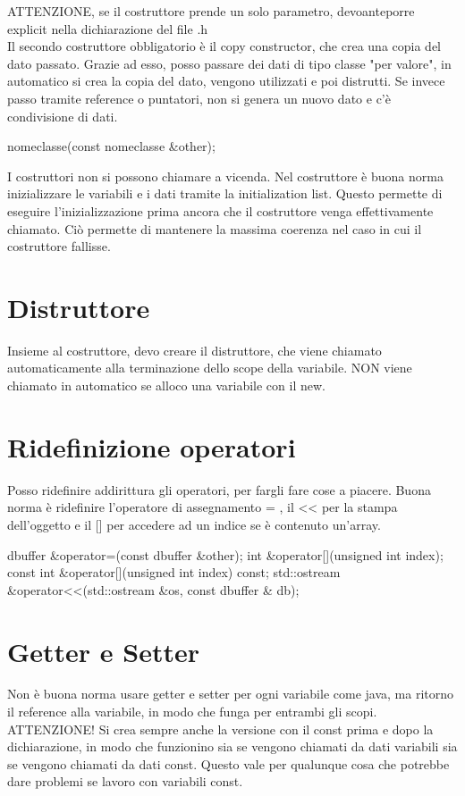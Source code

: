 ATTENZIONE, se il costruttore prende un solo parametro, devoanteporre explicit nella dichiarazione del file .h \\
Il secondo costruttore obbligatorio è il copy constructor, che crea una copia del dato passato. Grazie ad esso, posso passare dei dati di tipo classe "per valore", in automatico si crea la copia del dato, vengono utilizzati e poi distrutti. Se invece passo tramite reference o puntatori, non si genera un nuovo dato e c'è condivisione di dati.

\begin{cpp}
nomeclasse(const nomeclasse &other);
\end{cpp}

I costruttori non si possono chiamare a vicenda. Nel costruttore è buona norma inizializzare le variabili e i dati tramite la initialization list. Questo permette di eseguire l'inizializzazione prima ancora che il costruttore venga effettivamente chiamato. Ciò permette di mantenere la massima coerenza nel caso in cui il costruttore fallisse.

\section{Distruttore}
Insieme al costruttore, devo creare il distruttore, che viene chiamato automaticamente alla terminazione dello scope della variabile. NON viene chiamato in automatico se alloco una variabile con il new.

\section{Ridefinizione operatori}
Posso ridefinire addirittura gli operatori, per fargli fare cose a piacere. Buona norma è ridefinire l'operatore di assegnamento = , il << per la stampa dell'oggetto e il [] per accedere ad un indice se è contenuto un'array.

\begin{cpp}
dbuffer &operator=(const dbuffer &other);
int &operator[](unsigned int index);
const int &operator[](unsigned int index) const;
std::ostream &operator<<(std::ostream &os, const dbuffer & db);
\end{cpp}

\section{Getter e Setter}
Non è buona norma usare getter e setter per ogni variabile come java, ma ritorno il reference alla variabile, in modo che funga per entrambi gli scopi. ATTENZIONE! Si crea sempre anche la versione con il const prima e dopo la dichiarazione, in modo che funzionino sia se vengono chiamati da dati variabili sia se vengono chiamati da dati const. Questo vale per qualunque cosa che potrebbe dare problemi se lavoro con variabili const.


